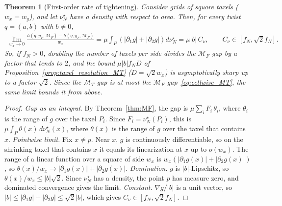 \documentclass[11pt,a4paper]{article}
\theoremstyle{plain}
\newtheorem{theorem}{Theorem}[section]
\newtheorem{remark}[theorem]{Remark}
\begin{document}
\begin{theorem}[First-order rate of tightening]
\label{thm:rate}
    Consider grids of square taxels ($w_x=w_y$), and let $\nu_N^\star$ have a density with respect to area. Then, for every twist $q=(a,b)$ with $b\neq0$,
    \begin{align}
        \label{eq:rate}
        \lim_{w_x\to0}\frac{\overline h(q;y_F,\mathcal M_F)-\underline h(q;y_F,\mathcal M_F)}{w_x}=\mu\int_P\left(|\partial_1g|+|\partial_2g|\right)d\nu_N^\star=\mu|b|\,C_\nu,
        \qquad C_\nu\in\left[f_N,\sqrt2f_N\right].
    \end{align}
    So, if $f_N>0$, doubling the number of taxels per side divides the $\mathcal M_F$ gap by a factor that tends to $2$, and the bound $\mu|b|f_ND$ of Proposition~\ref{prop:taxel_resolution_MT} ($D=\sqrt2w_x$)
    is asymptotically sharp up to a factor $\sqrt2$. Since the $\mathcal M_T$ gap is at most the $\mathcal M_F$ gap~\eqref{eq:cellwise_MT}, the same limit bounds it from above.
\end{theorem}
\begin{proof}
    \emph{Gap as an integral.} By Theorem~\ref{thm:MF}, the gap is $\mu\sum_iF_i\,\theta_i$, where $\theta_i$ is the range of $g$ over the taxel $P_i$.
    Since $F_i=\nu_N^\star(P_i)$, this is
    $\mu\int_P\theta(x)\,d\nu_N^\star(x)$, where $\theta(x)$ is the range of $g$ over the taxel that contains $x$.
    \emph{Pointwise limit.} Fix $x\neq p$. Near $x$, $g$ is continuously differentiable, so on the shrinking taxel that contains $x$ it equals its linearization at $x$ up to $o(w_x)$. The range of a linear function
    over a square of side $w_x$ is $w_x(|\partial_1g(x)|+|\partial_2g(x)|)$, so $\theta(x)/w_x\to|\partial_1g(x)|+|\partial_2g(x)|$.
    \emph{Domination.} $g$ is $|b|$-Lipschitz, so $\theta(x)/w_x\le|b|\sqrt2$. Since $\nu_N^\star$ has a density, the point $p$ has measure zero, and dominated convergence gives the limit.
    \emph{Constant.} $\nabla g/|b|$ is a unit vector, so $|b|\le|\partial_1g|+|\partial_2g|\le\sqrt2|b|$, which gives $C_\nu\in[f_N,\sqrt2f_N]$.
\end{proof}

\end{document}
